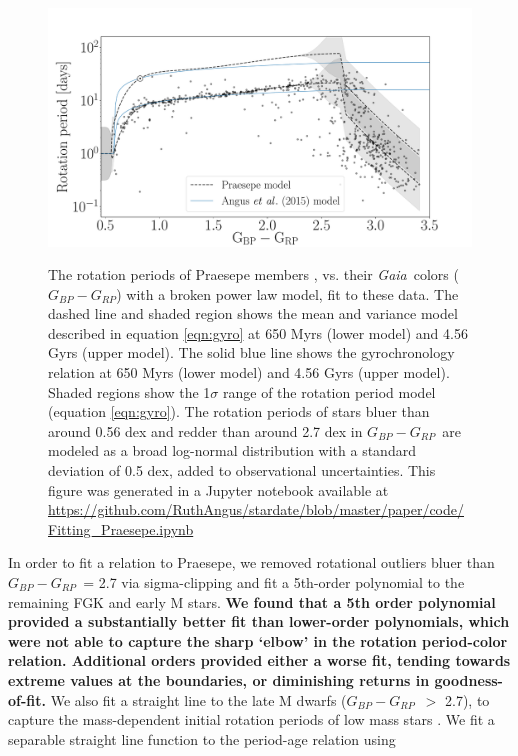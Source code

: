 \documentclass[useAMS, usenatbib, preprint, 12pt]{aastex}
\newcommand{\Gaia}{{\it Gaia}}
\newcommand{\gcolor}{$G_{BP} - G_{RP}$}
\newcommand{\racomment}[1]{{\bf #1}}
\begin{document}
\begin{figure}
  \caption{
    The rotation periods of Praesepe members \citep{douglas2016},
    vs. their \Gaia\ colors (\gcolor) with a broken power law model, fit to
    these data.
    The dashed line and shaded region shows the mean and variance model
    described in equation \ref{eqn:gyro} at 650 Myrs (lower model) and 4.56
    Gyrs (upper model).
    The solid blue line shows the \citep{angus2015} gyrochronology relation at
    650 Myrs (lower model) and 4.56 Gyrs (upper model).
    Shaded regions show the 1$\sigma$ range of the rotation period
    model (equation \ref{eqn:gyro}).
    The rotation periods of stars bluer than around 0.56 dex and redder than
    around 2.7 dex in \gcolor\ are modeled as a broad log-normal distribution
    with a standard deviation of 0.5 dex, added to observational
    uncertainties.
    This figure was generated in a Jupyter notebook available at
    \url{https://github.com/RuthAngus/stardate/blob/master/paper/code/Fitting_Praesepe.ipynb}
}
  \centering
    \includegraphics[width=1.1\textwidth]{praesepe}
\label{fig:praesepe}
\end{figure}
In order to fit a relation to Praesepe, we removed rotational outliers bluer
than \gcolor\ = 2.7 via sigma-clipping and fit a 5th-order polynomial to the
remaining FGK and early M stars.
\racomment{We found that a 5th order polynomial provided a substantially
better fit than lower-order polynomials, which were not able to capture the
sharp `elbow’ in the rotation period-color relation. Additional orders
provided either a worse
fit, tending towards extreme values at the boundaries, or diminishing returns
in goodness-of-fit.}
We also fit a straight line to the late M dwarfs (\gcolor\ $>$ 2.7), to
capture the mass-dependent initial rotation periods of low mass stars
\citep{somers2017}.
We fit a separable straight line function to the period-age relation using
\end{document}
